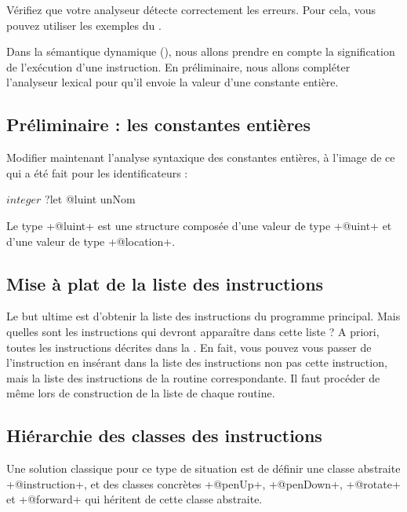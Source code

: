 Vérifiez que votre analyseur détecte correctement les erreurs. Pour cela, vous pouvez utiliser les exemples du .









Dans la sémantique dynamique (), nous allons prendre en compte la signification de l'exécution d'une instruction. En préliminaire, nous allons compléter l'analyseur lexical pour qu'il envoie la valeur d'une constante entière.

\subsection{Préliminaire : les constantes entières}

Modifier maintenant l’analyse syntaxique des constantes entières, à l’image de ce qui a été fait pour les identificateurs :
\begin{galgas}
$integer$ ?let @luint unNom
\end{galgas}

Le type \ggs+@luint+ est une structure composée d’une valeur de type \ggs+@uint+ et d’une valeur de type \ggs+@location+.

\subsection{Mise à plat de la liste des instructions}
Le but ultime est d'obtenir la liste des instructions du programme principal. Mais quelles sont les instructions qui devront apparaître dans cette liste ? A priori, toutes les instructions décrites dans la . En fait, vous pouvez vous passer de l'instruction  en insérant dans la liste des instructions non pas cette instruction, mais la liste des instructions de la routine correspondante. Il faut procéder de même lors de construction de la liste de chaque routine.

\subsection{Hiérarchie des classes des instructions}
Une solution classique pour ce type de situation est de définir une classe abstraite \ggs+@instruction+, et des classes concrètes \ggs+@penUp+, \ggs+@penDown+, \ggs+@rotate+ et \ggs+@forward+ qui héritent de cette classe abstraite.

